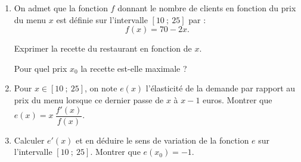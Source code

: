 %
%
\begin{enumerate}
     \item On admet que la fonction $f$ donnant le nombre de clients en fonction du prix du menu $x$ est définie sur l'intervalle $[10~;~25]$ par :
     \[f(x)=70-2x.\]
     \par
     Exprimer la recette du restaurant en fonction de $x$.
     \par
     Pour quel prix $x_0$ la recette est-elle maximale ?
     \item Pour $x \in [10~;~25]$, on note $e(x)$ l'élasticité de la demande par rapport au prix du menu lorsque ce dernier passe de $x$ à $x-1$ euros.
     Montrer que $e(x)=x\ \dfrac{f'(x)}{f(x)}$.
     \item Calculer $e'(x)$ et en déduire le sens de variation de la fonction $e$ sur l'intervalle $[10~;~25]$.
     Montrer que $e(x_0)=-1$.
     \par
\end{enumerate}

